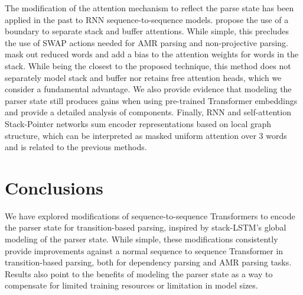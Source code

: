 \documentclass[11pt,a4paper]{article}
\begin{document}
The modification of the attention mechanism to reflect the parse state has been applied in the past to RNN sequence-to-sequence models.  propose the use of a boundary to separate stack and buffer attentions. While simple, this precludes the use of SWAP actions needed for AMR parsing and non-projective parsing.  mask out reduced words and add a bias to the attention weights for words in the stack. While being the closest to the proposed technique, this method does not separately model stack and buffer nor retains free attention heads, which we consider a fundamental advantage. We also provide evidence that modeling the parser state still produces gains when using pre-trained Transformer embeddings and provide a detailed analysis of components. Finally, RNN \cite{ma-etal-2018-stack} and self-attention \cite{ahmad-etal-2019-difficulties} Stack-Pointer networks sum encoder representations based on local graph structure, which can be interpreted as masked uniform attention over $3$ words and is related to the previous methods.

\section{Conclusions}

We have explored modifications of sequence-to-sequence Transformers to encode the parser state for transition-based parsing, inspired by stack-LSTM's global modeling of the parser state. While simple, these modifications consistently provide improvements against a normal sequence to sequence Transformer in transition-based parsing, both for dependency parsing and AMR parsing tasks. Results also point to the benefits of modeling the parser state as a way to compensate for limited training resources or limitation in model sizes. 
\end{document}
